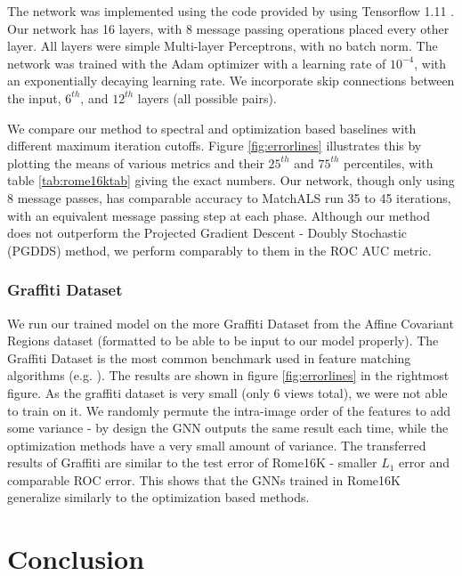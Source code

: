 \documentclass{article} %
\begin{document}
The network was implemented using the code provided by \cite{battaglia2018relational} using Tensorflow 1.11 \citep{tensorflow2015}.
Our network has 16 layers, with 8 message passing operations placed every other layer.
All layers were simple Multi-layer Perceptrons, with no batch norm.
The network was trained with the Adam optimizer \citep{kingma2014adam} with a learning rate of $10^{-4}$, with an exponentially decaying learning rate.
We incorporate skip connections between the input, $6^{th}$, and $12^{th}$ layers (all possible pairs).

We compare our method to spectral and optimization based baselines with different maximum iteration cutoffs.
Figure \ref{fig:errorlines} illustrates this by plotting the means of various metrics and their $25^{th}$ and $75^{th}$ percentiles, with table \ref{tab:rome16ktab} giving the exact numbers.
Our network, though only using 8 message passes, has comparable accuracy to MatchALS \citep{zhou2015multi} run 35 to 45 iterations, with an equivalent message passing step at each phase.
Although our method does not outperform the Projected Gradient Descent - Doubly Stochastic (PGDDS) \citep{leonardos2017distributed} method, we perform comparably to them in the ROC AUC metric.

\subsubsection{Graffiti Dataset} \label{sec:graffiti}
We run our trained model on the more Graffiti Dataset from the Affine Covariant Regions dataset (formatted to be able to be input to our model properly).
The Graffiti Dataset is the most common benchmark used in feature matching algorithms (e.g. \cite{leonardos2017distributed, zhou2015multi}).
The results are shown in figure \ref{fig:errorlines} in the rightmost figure.
As the graffiti dataset is very small (only 6 views total), we were not able to train on it.
We randomly permute the intra-image order of the features to add some variance - by design the GNN outputs the same result each time, while the optimization methods have a very small amount of variance.
The transferred results of Graffiti are similar to the test error of Rome16K - smaller $L_1$ error and comparable ROC error.
This shows that the GNNs trained in Rome16K generalize similarly to the optimization based methods.

\section{Conclusion}
\end{document}
